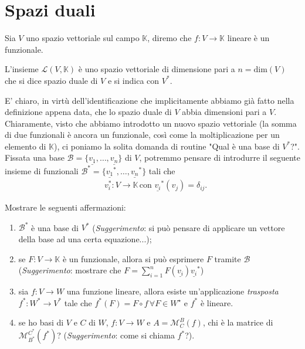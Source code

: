 \section{Spazi duali}
\begin{definition}[funzionale]
    Sia $V$ uno spazio vettoriale sul campo $\mathbb{K}$, diremo che $f: V \to \mathbb{K}$ lineare è un funzionale.
\end{definition}
\begin{definition}
    L'insieme $\mathcal{L}(V, \mathbb{K})$ è uno spazio vettoriale di dimensione pari a $n = \text{dim}(V)$ che si dice spazio duale di $V$ e si indica con $V^*$.
\end{definition}
E' chiaro, in virtù dell'identificazione che implicitamente abbiamo già fatto nella definizione appena data, che lo spazio duale di $V$ abbia dimensioni pari a $V$. Chiaramente, visto che abbiamo introdotto un nuovo spazio vettoriale (la somma di due funzionali è ancora un funzionale, così come la moltiplicazione per un elemento di $\mathbb{K}$), ci poniamo
la solita domanda di routine "Qual è una base di $V^*$?". \\
Fissata una base $\mathcal{B}=\{ \underline{v_1}, \ldots, \underline{v_n} \}$ di $V$, potremmo pensare di introdurre il seguente insieme di funzionali $\mathcal{B}^* = \{ \underline{v_1}^*, \ldots, \underline{v_n}^*\}$ tali che
\begin{align}
    &v_i^*: V \to \mathbb{K} \, \text{con } \underline{v_i}^*(v_j) = \delta_{ij}.
\end{align}
\begin{exercise}
    Mostrare le seguenti affermazioni:
    \begin{enumerate}[label=\protect\circled{\arabic*}]
        \item $\mathcal{B}^*$ è una base di $V^*$ (\emph{Suggerimento}: si può pensare di applicare un vettore della base ad una certa equazione...);
        \item se $F: V \to \mathbb{K}$ è un funzionale, allora si può esprimere $F$ tramite $\mathcal{B}$ (\emph{Suggerimento}: mostrare che $F = \sum\limits_{i=1}^n F(\underline{v_i})\underline{v_i}^*$)
        \item sia $f: V \to W$ una funzione lineare, allora esiste un'applicazione \emph{trasposta} $f^*: W^* \to V^*$ tale che $f^*(F) = F \circ f \, \forall F \in W^\star$ e $f^*$ è lineare.
        \item se ho basi di $V$ e $C$ di $W$, $f: V \to W$ e $A = \mathcal{M}^B_C(f)$, chi è la matrice di $\mathcal{M}^{C^*}_{B^*}(f^*)$? (\emph{Suggerimento}: come si chiama $f^*$?).
    \end{enumerate}
\end{exercise}
